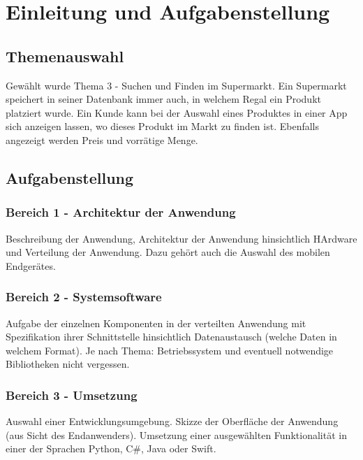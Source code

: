 \section{Einleitung und Aufgabenstellung}

\subsection{Themenauswahl}
Gewählt wurde Thema 3 - Suchen und Finden im Supermarkt.
Ein Supermarkt speichert in seiner Datenbank immer auch, in welchem Regal ein Produkt platziert wurde.
Ein Kunde kann bei der Auswahl eines Produktes in einer App sich anzeigen lassen, wo dieses Produkt im Markt zu finden ist.
Ebenfalls angezeigt werden Preis und vorrätige Menge.

\subsection{Aufgabenstellung}
\subsubsection{Bereich 1 - Architektur der Anwendung}
Beschreibung der Anwendung, Architektur der Anwendung hinsichtlich HArdware und Verteilung der Anwendung.
Dazu gehört auch die Auswahl des mobilen Endgerätes.

\subsubsection{Bereich 2 - Systemsoftware}
Aufgabe der einzelnen Komponenten in der verteilten Anwendung mit Spezifikation ihrer Schnittstelle hinsichtlich Datenaustausch (welche Daten in welchem Format).
Je nach Thema: Betriebssystem und eventuell notwendige Bibliotheken nicht vergessen.

\subsubsection{Bereich 3 - Umsetzung}
Auswahl einer Entwicklungsumgebung.
Skizze der Oberfläche der Anwendung (aus Sicht des Endanwenders).
Umsetzung einer ausgewählten Funktionalität in einer der Sprachen Python, C#, Java oder Swift.